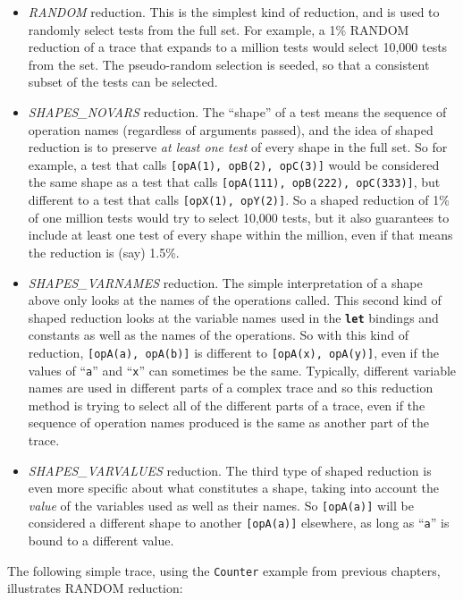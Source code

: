 \documentclass{overturerepchap}
\begin{document}
\begin{itemize}
\item \emph{RANDOM} reduction. This is the simplest kind of reduction, and is
used to randomly select tests from the full set. For example, a 1\% RANDOM 
reduction of a trace that expands to a million tests would select 10,000 tests
from the set. The pseudo-random selection is seeded, so that a consistent subset
of the tests can be selected.
\item \emph{SHAPES\_NOVARS} reduction. The ``shape'' of a test means the sequence
of operation names (regardless of arguments passed), and the idea of shaped
reduction is to preserve \emph{at least one test} of every shape in the full
set. So for example, a test that calls \texttt{[opA(1), opB(2), opC(3)]} would
be considered the same shape as a test that calls \texttt{[opA(111), opB(222),
opC(333)]}, but different to a test that calls \texttt{[opX(1), opY(2)]}. So a
shaped reduction of 1\% of one million tests would try to select 10,000 tests,
but it also guarantees to include at least one test of every shape within the
million, even if that means the reduction is (say) 1.5\%.
\item \emph{SHAPES\_VARNAMES} reduction. The simple interpretation of a
shape above only looks at the names of the operations called. This second kind
of shaped reduction looks at the variable names used in the
\texttt{\textbf{let}} bindings and constants as well as the names of the
operations. So with this kind of reduction, \texttt{[opA(a), opA(b)]} is
different to \texttt{[opA(x), opA(y)]}, even if the values of ``\texttt{a}''
and ``\texttt{x}'' can sometimes be the same.
Typically, different variable names are used in different parts of a complex
trace and so this reduction method is trying to select all of the different
parts of a trace, even if the sequence of operation names produced is the same
as another part of the trace.
\item \emph{SHAPES\_VARVALUES} reduction. The third type of shaped reduction is
even more specific about what constitutes a shape, taking into account the
\emph{value} of the variables used as well as their names. So \texttt{[opA(a)]}
will be considered a different shape to another \texttt{[opA(a)]} elsewhere, as
long as ``\texttt{a}'' is bound to a different value.
\end{itemize}

\noindent The following simple trace, using the \texttt{Counter} example from previous
chapters, illustrates RANDOM reduction:
\end{document}
